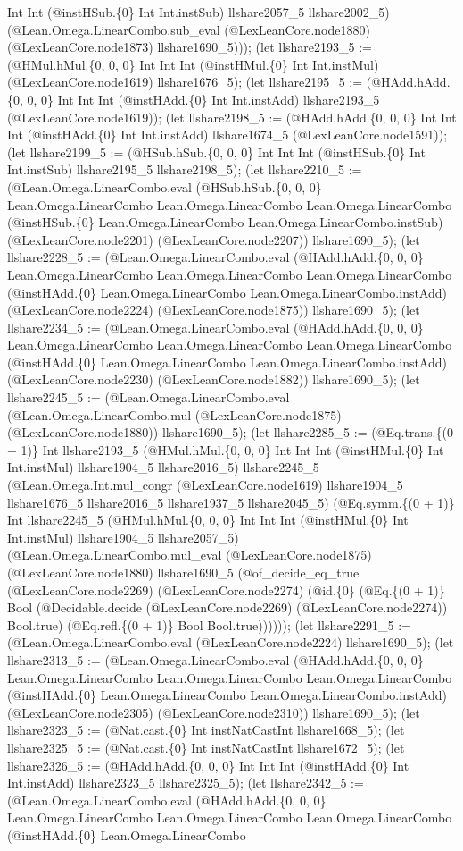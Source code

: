 \documentclass[11pt]{article}
\begin{document}
Int Int (@instHSub.\{0\} Int Int.instSub) llshare2057\_5 llshare2002\_5) (@Lean.Omega.LinearCombo.sub\_eval (@LexLeanCore.node1880) (@LexLeanCore.node1873) llshare1690\_5))); (let llshare2193\_5 := (@HMul.hMul.\{0, 0, 0\} Int Int Int (@instHMul.\{0\} Int Int.instMul) (@LexLeanCore.node1619) llshare1676\_5); (let llshare2195\_5 := (@HAdd.hAdd.\{0, 0, 0\} Int Int Int (@instHAdd.\{0\} Int Int.instAdd) llshare2193\_5 (@LexLeanCore.node1619)); (let llshare2198\_5 := (@HAdd.hAdd.\{0, 0, 0\} Int Int Int (@instHAdd.\{0\} Int Int.instAdd) llshare1674\_5 (@LexLeanCore.node1591)); (let llshare2199\_5 := (@HSub.hSub.\{0, 0, 0\} Int Int Int (@instHSub.\{0\} Int Int.instSub) llshare2195\_5 llshare2198\_5); (let llshare2210\_5 := (@Lean.Omega.LinearCombo.eval (@HSub.hSub.\{0, 0, 0\} Lean.Omega.LinearCombo Lean.Omega.LinearCombo Lean.Omega.LinearCombo (@instHSub.\{0\} Lean.Omega.LinearCombo Lean.Omega.LinearCombo.instSub) (@LexLeanCore.node2201) (@LexLeanCore.node2207)) llshare1690\_5); (let llshare2228\_5 := (@Lean.Omega.LinearCombo.eval (@HAdd.hAdd.\{0, 0, 0\} Lean.Omega.LinearCombo Lean.Omega.LinearCombo Lean.Omega.LinearCombo (@instHAdd.\{0\} Lean.Omega.LinearCombo Lean.Omega.LinearCombo.instAdd) (@LexLeanCore.node2224) (@LexLeanCore.node1875)) llshare1690\_5); (let llshare2234\_5 := (@Lean.Omega.LinearCombo.eval (@HAdd.hAdd.\{0, 0, 0\} Lean.Omega.LinearCombo Lean.Omega.LinearCombo Lean.Omega.LinearCombo (@instHAdd.\{0\} Lean.Omega.LinearCombo Lean.Omega.LinearCombo.instAdd) (@LexLeanCore.node2230) (@LexLeanCore.node1882)) llshare1690\_5); (let llshare2245\_5 := (@Lean.Omega.LinearCombo.eval (@Lean.Omega.LinearCombo.mul (@LexLeanCore.node1875) (@LexLeanCore.node1880)) llshare1690\_5); (let llshare2285\_5 := (@Eq.trans.\{(0 + 1)\} Int llshare2193\_5 (@HMul.hMul.\{0, 0, 0\} Int Int Int (@instHMul.\{0\} Int Int.instMul) llshare1904\_5 llshare2016\_5) llshare2245\_5 (@Lean.Omega.Int.mul\_congr (@LexLeanCore.node1619) llshare1904\_5 llshare1676\_5 llshare2016\_5 llshare1937\_5 llshare2045\_5) (@Eq.symm.\{(0 + 1)\} Int llshare2245\_5 (@HMul.hMul.\{0, 0, 0\} Int Int Int (@instHMul.\{0\} Int Int.instMul) llshare1904\_5 llshare2057\_5) (@Lean.Omega.LinearCombo.mul\_eval (@LexLeanCore.node1875) (@LexLeanCore.node1880) llshare1690\_5 (@of\_decide\_eq\_true (@LexLeanCore.node2269) (@LexLeanCore.node2274) (@id.\{0\} (@Eq.\{(0 + 1)\} Bool (@Decidable.decide (@LexLeanCore.node2269) (@LexLeanCore.node2274)) Bool.true) (@Eq.refl.\{(0 + 1)\} Bool Bool.true)))))); (let llshare2291\_5 := (@Lean.Omega.LinearCombo.eval (@LexLeanCore.node2224) llshare1690\_5); (let llshare2313\_5 := (@Lean.Omega.LinearCombo.eval (@HAdd.hAdd.\{0, 0, 0\} Lean.Omega.LinearCombo Lean.Omega.LinearCombo Lean.Omega.LinearCombo (@instHAdd.\{0\} Lean.Omega.LinearCombo Lean.Omega.LinearCombo.instAdd) (@LexLeanCore.node2305) (@LexLeanCore.node2310)) llshare1690\_5); (let llshare2323\_5 := (@Nat.cast.\{0\} Int instNatCastInt llshare1668\_5); (let llshare2325\_5 := (@Nat.cast.\{0\} Int instNatCastInt llshare1672\_5); (let llshare2326\_5 := (@HAdd.hAdd.\{0, 0, 0\} Int Int Int (@instHAdd.\{0\} Int Int.instAdd) llshare2323\_5 llshare2325\_5); (let llshare2342\_5 := (@Lean.Omega.LinearCombo.eval (@HAdd.hAdd.\{0, 0, 0\} Lean.Omega.LinearCombo Lean.Omega.LinearCombo Lean.Omega.LinearCombo (@instHAdd.\{0\} Lean.Omega.LinearCombo 
\end{document}
